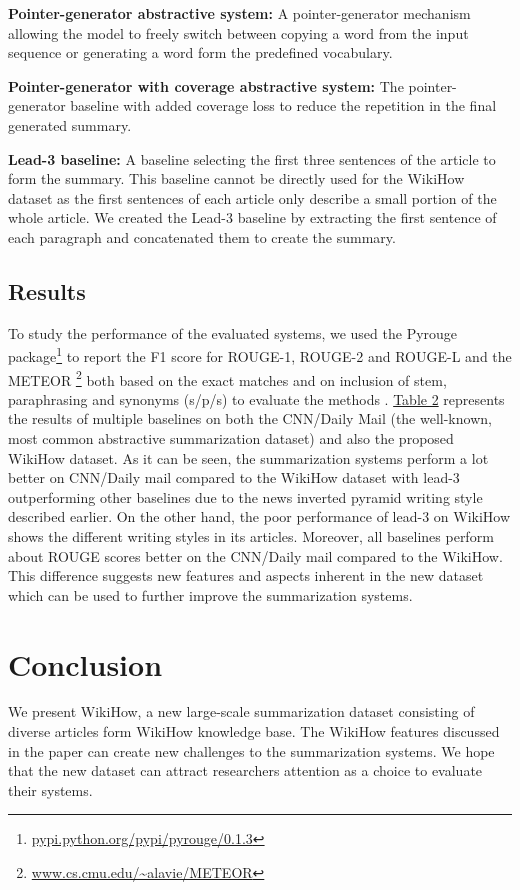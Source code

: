 \documentclass[11pt,a4paper]{article}
\begin{document}
\noindent\textbf{Pointer-generator abstractive system:} A pointer-generator mechanism \cite{see2017get} allowing the model to freely switch between copying a word from the input sequence or generating a word form the predefined vocabulary. 

\noindent\textbf{Pointer-generator with coverage abstractive system:} The pointer-generator baseline with added coverage loss \cite{see2017get} to reduce the repetition in the final generated summary.

\noindent\textbf{Lead-3 baseline:} A baseline selecting the first three sentences of the article to form the summary. 
This baseline cannot be directly used for the WikiHow dataset as the first  sentences of each article only describe a small portion of the whole article. We created the Lead-3 baseline by extracting the first sentence of each paragraph and concatenated them to create the summary.



\subsection{Results}
To study the performance of the evaluated systems, we used the Pyrouge package\footnote{\url{pypi.python.org/pypi/pyrouge/0.1.3}} to report the F1 score for ROUGE-1, ROUGE-2 and ROUGE-L \cite{lin2004rouge} and the METEOR \cite{banerjee2005meteor}\footnote{\url{www.cs.cmu.edu/~alavie/METEOR}} both based on the exact matches and on inclusion of stem, paraphrasing and synonyms (s/p/s) to evaluate the methods . \hyperref[results]{Table 2} represents the results of multiple baselines on both the CNN/Daily Mail (the well-known, most common abstractive summarization dataset) and also the proposed WikiHow dataset. As it can be seen, the summarization systems perform a lot better on CNN/Daily mail compared to the WikiHow dataset with lead-3 outperforming other baselines due to the news inverted pyramid writing style described earlier. On the other hand, the poor performance of lead-3 on WikiHow shows the different writing styles in its articles. Moreover, all baselines perform about  ROUGE scores better on the CNN/Daily mail compared to the WikiHow. This difference suggests new features and aspects inherent in the new dataset which can be used to further improve the summarization systems. 
\section{Conclusion}
We present WikiHow, a new large-scale summarization dataset consisting of diverse articles 
form WikiHow knowledge base. The WikiHow features discussed in the paper can create new challenges to the summarization systems. We hope that the new dataset can attract researchers attention as a choice to evaluate their systems. 


\end{document}
